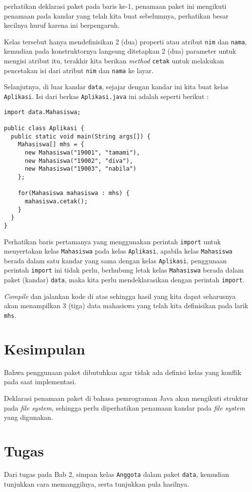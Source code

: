 perhatikan deklarasi paket pada baris ke-1, penamaan paket ini mengikuti penamaan pada kandar yang telah kita buat sebelumnya, perhatikan besar kecilnya huruf karena ini berpengaruh.

Kelas tersebut hanya mendefinisikan 2 (dua) properti atau atribut \texttt{nim} dan \texttt{nama}, kemudian pada konstruktornya langsung ditetapkan 2 (dua) parameter untuk mengisi atribut itu, terakhir kita berikan \textit{method} \texttt{cetak} untuk melakukan pencetakan isi dari atribut \texttt{nim} dan \texttt{nama} ke layar.

Selanjutnya, di luar kandar \texttt{data}, sejajar dengan kandar ini kita buat kelas \texttt{Aplikasi}. Isi dari berkas \texttt{Aplikasi.java} ini adalah seperti berikut :

\begin{lstlisting}
import data.Mahasiswa;

public class Aplikasi {
  public static void main(String args[]) {
    Mahasiswa[] mhs = {
      new Mahasiswa("19001", "tamami"),
      new Mahasiswa("19002", "diva"),
      new Mahasiswa("19003", "nabila")
    };

    for(Mahasiswa mahasiswa : mhs) {
      mahasiswa.cetak();
    }
  }
}
\end{lstlisting}

Perhatikan baris pertamanya yang menggunakan perintah \texttt{import} untuk menyertakan kelas \texttt{Mahasiswa} pada kelas \texttt{Aplikasi}, apabila kelas \texttt{Mahasiswa} berada dalam satu kandar yang sama dengan kelas \texttt{Aplikasi}, penggunaan perintah \texttt{import} ini tidak perlu, berhubung letak kelas \texttt{Mahasiswa} berada dalam paket (kandar) \texttt{data}, maka kita perlu mendeklarasikan dengan perintah \texttt{import}.

\textit{Compile} dan jalankan kode di atas sehingga hasil yang kita dapat seharusnya akan menampilkan 3 (tiga) data mahasiswa yang telah kita definisikan pada larik \texttt{mhs}.

\section{Kesimpulan}

Bahwa penggunaan paket dibutuhkan agar tidak ada definisi kelas yang konflik pada saat implementasi. 

Deklarasi penamaan paket di bahasa pemrograman Java akan mengikuti struktur pada \textit{file system}, sehingga perlu diperhatikan penamaan kandar pada \textit{file system} yang digunakan.

\section{Tugas}

Dari tugas pada Bab 2, simpan kelas \texttt{Anggota} dalam paket \texttt{data}, kemudian tunjukkan cara memanggilnya, serta tunjukkan pula hasilnya.